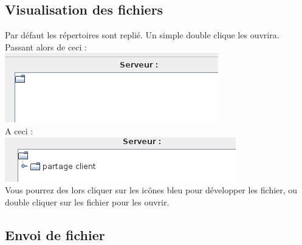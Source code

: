 \documentclass[12pt,a4paper]{article}
\begin{document}
\subsection{Visualisation des fichiers}
\begin{center}
	Par défaut les répertoires sont replié. Un simple double clique les ouvrira. \\
	Passant alors de ceci : \\
	\includegraphics[scale=0.5]{images/fichier.png} \\

	A ceci : \\
	\includegraphics[scale=0.5]{images/dev.png} \\
	
	Vous pourrez des lors cliquer sur les icônes bleu pour développer les fichier, ou double cliquer sur les fichier pour les ouvrir.
	
\end{center}

\subsection{Envoi de fichier}
\end{document}
